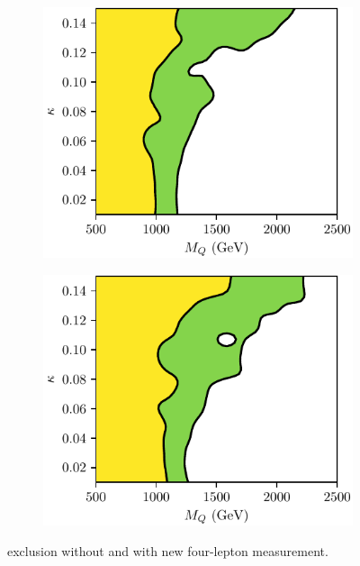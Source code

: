 \begin{figure}[tbp]
    \begin{subfigure}{.45\textwidth}\centering
      \includegraphics[width=.99\linewidth]{Figures/VLQ/newm4l/1gen-old-ATLAS_13_4LLevels.pdf} \caption{}\label{fig:gen1:4lold}
    \end{subfigure}
        \begin{subfigure}{.45\textwidth}\centering
      \includegraphics[width=.99\linewidth]{Figures/VLQ/newm4l/1gen-ATLAS_13_4LLevels.pdf}\caption{}\label{fig:gen1:4lnew}
    \end{subfigure}
    \caption{\contur exclusion without and with new four-lepton measurement.}
    \label{fig:gen1:4l}
\end{figure}

